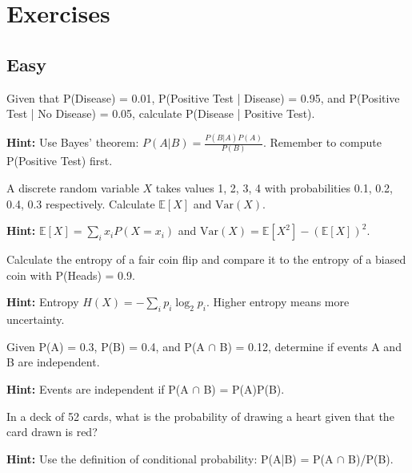 
\section*{Exercises}

\subsection*{Easy}

\begin{problem}
Given that P(Disease) = 0.01, P(Positive Test | Disease) = 0.95, and P(Positive Test | No Disease) = 0.05, calculate P(Disease | Positive Test).

\textbf{Hint:} Use Bayes' theorem: $P(A|B) = \frac{P(B|A)P(A)}{P(B)}$. Remember to compute P(Positive Test) first.
\end{problem}

\begin{problem}
A discrete random variable $X$ takes values 1, 2, 3, 4 with probabilities 0.1, 0.2, 0.4, 0.3 respectively. Calculate $\mathbb{E}[X]$ and $\text{Var}(X)$.

\textbf{Hint:} $\mathbb{E}[X] = \sum_i x_i P(X=x_i)$ and $\text{Var}(X) = \mathbb{E}[X^2] - (\mathbb{E}[X])^2$.
\end{problem}

\begin{problem}
Calculate the entropy of a fair coin flip and compare it to the entropy of a biased coin with P(Heads) = 0.9.

\textbf{Hint:} Entropy $H(X) = -\sum_i p_i \log_2 p_i$. Higher entropy means more uncertainty.
\end{problem}

\begin{problem}
Given P(A) = 0.3, P(B) = 0.4, and P(A $\cap$ B) = 0.12, determine if events A and B are independent.

\textbf{Hint:} Events are independent if P(A $\cap$ B) = P(A)P(B).
\end{problem}

\begin{problem}
In a deck of 52 cards, what is the probability of drawing a heart given that the card drawn is red?

\textbf{Hint:} Use the definition of conditional probability: P(A|B) = P(A $\cap$ B)/P(B).
\end{problem}

